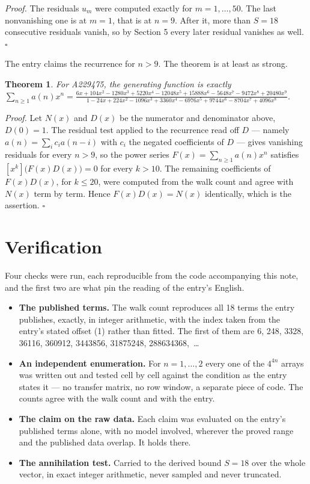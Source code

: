 \documentclass[11pt]{article}
\newtheorem{theorem}{Theorem}
\theoremstyle{definition}
\begin{document}
{\itshape Proof.} The residuals $u_m$ were computed exactly for $m = 1,\dots,50$. The last nonvanishing one is at $m = 1$, that is at $n = 9$. After it, more than $S = 18$ consecutive residuals vanish, so by Section 5 every later residual vanishes as well. $\square$

The entry claims the recurrence for $n > 9$. The theorem is at least as strong.

\begin{theorem} For A229475, the generating function is exactly $\sum_{n\ge 1} a(n)x^n = \frac{6x + 104x^{2} - 1280x^{3} + 5220x^{4} - 12048x^{5} + 15888x^{6} - 5648x^{7} - 9472x^{8} + 20480x^{9}}{1 - 24x + 224x^{2} - 1096x^{3} + 3360x^{4} - 6976x^{5} + 9744x^{6} - 8704x^{7} + 4096x^{8}}$.\end{theorem}

{\itshape Proof.} Let $N(x)$ and $D(x)$ be the numerator and denominator above, $D(0)=1$. The residual test applied to the recurrence read off $D$ --- namely $a(n) = \sum_i c_i a(n-i)$ with $c_i$ the negated coefficients of $D$ --- gives vanishing residuals for every $n > 9$, so the power series $F(x)=\sum_{n\ge 1}a(n)x^n$ satisfies $[x^k]\bigl(F(x)D(x)\bigr) = 0$ for every $k > 10$. The remaining coefficients of $F(x)D(x)$, for $k \le 20$, were computed from the walk count and agree with $N(x)$ term by term. Hence $F(x)D(x) = N(x)$ identically, which is the assertion. $\square$

\section{Verification}

Four checks were run, each reproducible from the code accompanying this note, and the first two are what pin the reading of the entry's English.

\begin{itemize}

\item {\bfseries The published terms.} The walk count reproduces all 18 terms the entry publishes, exactly, in integer arithmetic, with the index taken from the entry's stated offset (1) rather than fitted. The first of them are 6, 248, 3328, 36116, 360912, 3443856, 31875248, 288634368,~\dots

\item {\bfseries An independent enumeration.} For $n = 1,\dots,2$ every one of the $4^{4n}$ arrays was written out and tested cell by cell against the condition as the entry states it --- no transfer matrix, no row window, a separate piece of code. The counts agree with the walk count and with the entry.

\item {\bfseries The claim on the raw data.} Each claim was evaluated on the entry's published terms alone, with no model involved, wherever the proved range and the published data overlap. It holds there.

\item {\bfseries The annihilation test.} Carried to the derived bound $S = 18$ over the whole vector, in exact integer arithmetic, never sampled and never truncated.

\end{itemize}
\end{document}

